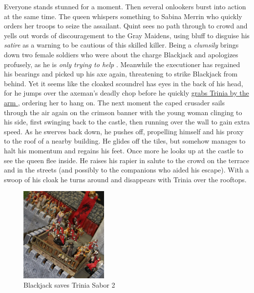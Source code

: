 Everyone stands stunned for a moment. Then several onlookers burst into action at the same time. The queen whispers something to Sabina Merrin who quickly orders her troops to seize the assailant. Quint sees no path through to crowd and yells out words of discouragement to the Gray Maidens, using bluff to disguise his {\itshape satire} as a warning to be cautious of this skilled killer. Being a  {\itshape clumsily} brings down two female soldiers who were about the charge Blackjack and apologizes profusely, as he is  {\itshape only trying to help} . Meanwhile the executioner has regained his bearings and picked up his axe again, threatening to strike Blackjack from behind. Yet it seems like the cloaked scoundrel has eyes in the back of his head, for he jumps over the axeman's deadly chop before he quickly \hyperref[fig:Blackjack-saves-Trinia-Sabor-2-472559200]{ grabs Trinia by the arm } , ordering her to hang on. The next moment the caped crusader sails through the air again on the crimson banner with the young woman clinging to his side, first swinging back to the castle, then running over the wall to gain extra speed. As he swerves back down, he pushes off, propelling himself and his proxy to the roof of a nearby building. He glides off the tiles, but somehow manages to halt his momentum and regains his feet. Once more he looks up at the castle to see the queen flee inside. He raises his rapier in salute to the crowd on the terrace and in the streets (and possibly to the companions who aided his escape). With a swoop of his cloak he turns around and disappears with Trinia over the rooftops. \\

\begin{figure}[h]
	\centering
	\includegraphics[width=0.39\textwidth]{images/Blackjack-saves-Trinia-Sabor-2-472559200.jpg}
	\caption{Blackjack saves Trinia Sabor 2}
	\label{fig:Blackjack-saves-Trinia-Sabor-2-472559200}
\end{figure}

